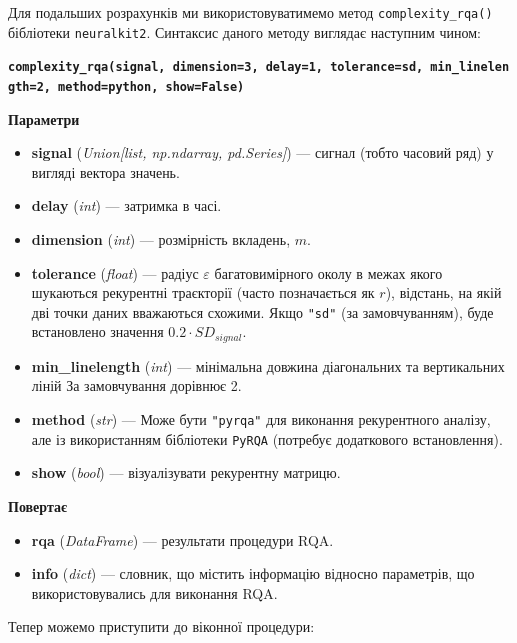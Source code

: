 \documentclass[
  letterpaper,
]{report}
\providecommand{\tightlist}{%
  \setlength{\itemsep}{0pt}\setlength{\parskip}{0pt}}\usepackage{longtable,booktabs,array}
\begin{document}
Для подальших розрахунків ми використовуватимемо метод
\texttt{complexity\_rqa()} бібліотеки \texttt{neuralkit2}. Синтаксис
даного методу виглядає наступним чином:

\textbf{\texttt{complexity\_rqa(signal,\ dimension=3,\ delay=1,\ tolerance=\textquotesingle{}sd\textquotesingle{},\ min\_linelength=2,\ method=\textquotesingle{}python\textquotesingle{},\ show=False)}}

\textbf{Параметри}

\begin{itemize}
\tightlist
\item
  \textbf{signal} (\emph{Union{[}list, np.ndarray, pd.Series{]}}) ---
  сигнал (тобто часовий ряд) у вигляді вектора значень.
\item
  \textbf{delay} (\emph{int}) --- затримка в часі.
\item
  \textbf{dimension} (\emph{int}) --- розмірність вкладень, \(m\).
\item
  \textbf{tolerance} (\emph{float}) --- радіус \(\varepsilon\)
  багатовимірного околу в межах якого шукаються рекурентні траєкторії
  (часто позначається як \(r\)), відстань, на якій дві точки даних
  вважаються схожими. Якщо \texttt{"sd"} (за замовчуванням), буде
  встановлено значення \(0.2 \cdot SD_{signal}\).
\item
  \textbf{min\_linelength} (\emph{int}) --- мінімальна довжина
  діагональних та вертикальних ліній За замовчування дорівнює 2.
\item
  \textbf{method} (\emph{str}) --- Може бути \texttt{"pyrqa"} для
  виконання рекурентного аналізу, але із використанням бібліотеки
  \texttt{PyRQA} (потребує додаткового встановлення).
\item
  \textbf{show} (\emph{bool}) --- візуалізувати рекурентну матрицю.
\end{itemize}

\textbf{Повертає}

\begin{itemize}
\tightlist
\item
  \textbf{rqa} (\emph{DataFrame}) --- результати процедури RQA.
\item
  \textbf{info} (\emph{dict}) --- словник, що містить інформацію
  відносно параметрів, що використовувались для виконання RQA.
\end{itemize}

Тепер можемо приступити до віконної процедури:
\end{document}
